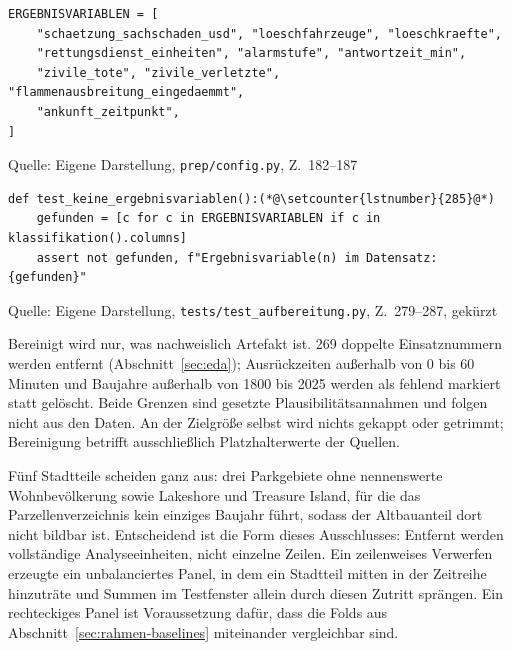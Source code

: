 \documentclass[12pt,a4paper]{article}
\newcommand{\tabquelle}[1][Eigene Darstellung]{%
  \par\setlength{\parskip}{0pt}\vspace{3pt}%
  {\setstretch{1}\fontsize{9pt}{11pt}\selectfont\raggedright Quelle: #1\par}%
}
\begin{document}
\begin{quellcode}[htbp]
\caption{Gesperrte Ergebnisvariablen}
\label{lst:gesperrt}\vspace{-3.5pt}
\begin{lstlisting}[style=pythonstil,firstnumber=182]
ERGEBNISVARIABLEN = [
    "schaetzung_sachschaden_usd", "loeschfahrzeuge", "loeschkraefte",
    "rettungsdienst_einheiten", "alarmstufe", "antwortzeit_min",
    "zivile_tote", "zivile_verletzte", "flammenausbreitung_eingedaemmt",
    "ankunft_zeitpunkt",
]
\end{lstlisting}
\tabquelle[Eigene Darstellung, \texttt{prep/config.py}, Z.~182--187]
\end{quellcode}
 
\begin{quellcode}[htbp]
\caption{Prüfung auf Ergebnisvariablen in der erzeugten Datei}
\label{lst:test-leakage}\vspace{-3.5pt}
\begin{lstlisting}[style=pythonstil,firstnumber=279]
def test_keine_ergebnisvariablen():(*@\setcounter{lstnumber}{285}@*)
    gefunden = [c for c in ERGEBNISVARIABLEN if c in klassifikation().columns]
    assert not gefunden, f"Ergebnisvariable(n) im Datensatz: {gefunden}"
\end{lstlisting}
\tabquelle[Eigene Darstellung, \texttt{tests/test\_aufbereitung.py}, Z.~279--287, gekürzt]
\end{quellcode}
 
Bereinigt wird nur, was nachweislich Artefakt ist. 269 doppelte Einsatznummern
werden entfernt (Abschnitt~\ref{sec:eda}); Ausrückzeiten außerhalb von 0 bis 60
Minuten und Baujahre außerhalb von 1800 bis 2025 werden als fehlend markiert
statt gelöscht. Beide Grenzen sind gesetzte Plausibilitätsannahmen und folgen
nicht aus den Daten. An der Zielgröße selbst wird nichts gekappt oder getrimmt;
Bereinigung betrifft ausschließlich Platzhalterwerte der Quellen.
 
Fünf Stadtteile scheiden ganz aus: drei Parkgebiete ohne nennenswerte
Wohnbevölkerung sowie Lakeshore und Treasure Island, für die das
Parzellenverzeichnis kein einziges Baujahr führt, sodass der Altbauanteil dort
nicht bildbar ist. Entscheidend ist die Form
dieses Ausschlusses: Entfernt werden vollständige Analyseeinheiten, nicht
einzelne Zeilen. Ein zeilenweises Verwerfen erzeugte ein unbalanciertes Panel,
in dem ein Stadtteil mitten in der Zeitreihe hinzuträte und Summen im
Testfenster allein durch diesen Zutritt sprängen. Ein rechteckiges Panel ist
Voraussetzung dafür, dass die Folds aus Abschnitt~\ref{sec:rahmen-baselines}
miteinander vergleichbar sind.
 
\end{document}
